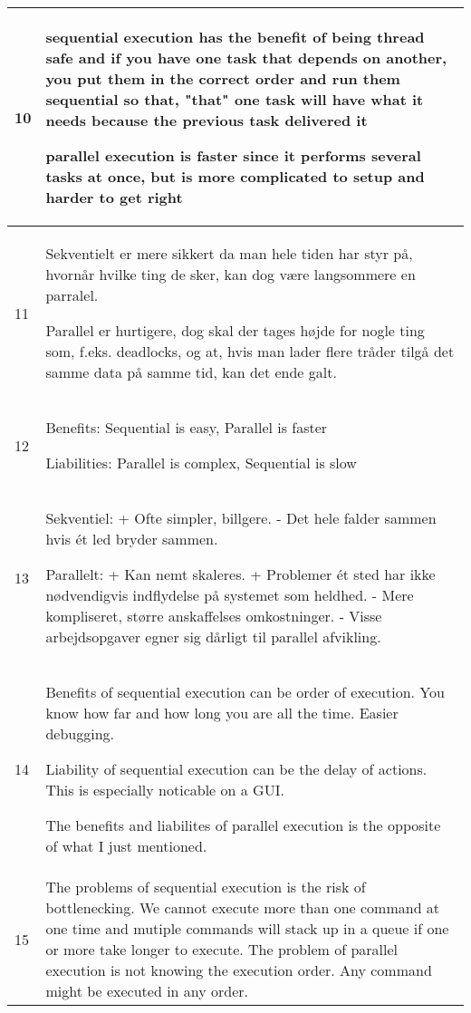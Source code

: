\begin{longtable}{|p{0.3cm}|p{14.7cm}|}
10 & sequential execution has the benefit of being thread safe and if you have one task that depends on another, you put them in the correct order and run them sequential so that, "that" one task will have what it needs because the previous task delivered it

\noindent parallel execution is faster since it performs several tasks at once, but is more complicated to setup and harder to get right \\ \hline

11 & Sekventielt er mere sikkert da man hele tiden har styr på, hvornår hvilke ting de sker, kan dog være langsommere en parralel.

\noindent Parallel er hurtigere, dog skal der tages højde for nogle ting som, f.eks. deadlocks, og at, hvis man lader flere tråder tilgå det samme data på samme tid, kan det ende galt. \\ \hline

12 & Benefits: Sequential is easy, Parallel is faster

\noindent Liabilities: Parallel is complex, Sequential is slow \\ \hline

13 & Sekventiel: + Ofte simpler, billgere. - Det hele falder sammen hvis ét led bryder sammen. 

\noindent Parallelt: + Kan nemt skaleres. + Problemer ét sted har ikke nødvendigvis indflydelse på systemet som heldhed. - Mere kompliseret, større anskaffelses omkostninger. - Visse arbejdsopgaver egner sig dårligt til parallel afvikling. \\ \hline

14 & Benefits of sequential execution can be order of execution. You know how far and how long you are all the time. Easier debugging. 

\noindent Liability of sequential execution can be the delay of actions. This is especially noticable on a GUI.

\noindent The benefits and liabilites of parallel execution is the opposite of what I just mentioned. \\ \hline

15 & The problems of sequential execution is the risk of bottlenecking. We cannot execute more than one command at one time and mutiple commands will stack up in a queue if one or more take longer to execute. The problem of parallel execution is not knowing the execution order. Any command might be executed in any order. \\ \hline


\end{longtable}
